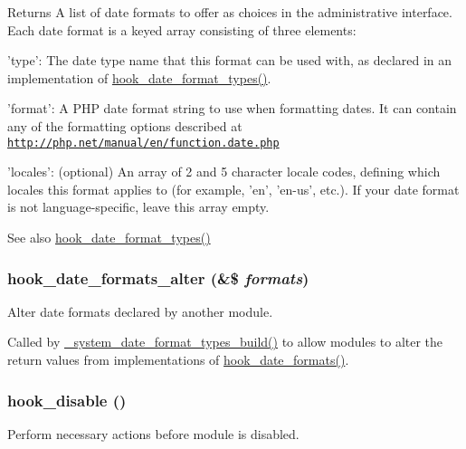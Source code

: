\begin{DoxyReturn}{Returns}
A list of date formats to offer as choices in the administrative interface. Each date format is a keyed array consisting of three elements:
\begin{DoxyItemize}
\item 'type': The date type name that this format can be used with, as declared in an implementation of \hyperlink{group__hooks_gaadde7af71d0b4f827cf7aac1c88c4d23}{hook\_\-date\_\-format\_\-types()}.
\item 'format': A PHP date format string to use when formatting dates. It can contain any of the formatting options described at \href{http://php.net/manual/en/function.date.php}{\tt http://php.net/manual/en/function.date.php}
\item 'locales': (optional) An array of 2 and 5 character locale codes, defining which locales this format applies to (for example, 'en', 'en-\/us', etc.). If your date format is not language-\/specific, leave this array empty.
\end{DoxyItemize}
\end{DoxyReturn}
\begin{DoxySeeAlso}{See also}
\hyperlink{group__hooks_gaadde7af71d0b4f827cf7aac1c88c4d23}{hook\_\-date\_\-format\_\-types()} 
\end{DoxySeeAlso}
\hypertarget{group__hooks_ga0adddc1a49ca34ded3f081894de9d4f7}{
\subsubsection[{hook\_\-date\_\-formats\_\-alter}]{\setlength{\rightskip}{0pt plus 5cm}hook\_\-date\_\-formats\_\-alter (\&\$ {\em formats})}}
\label{group__hooks_ga0adddc1a49ca34ded3f081894de9d4f7}
Alter date formats declared by another module.

Called by \hyperlink{system_8module_aed8872b51fe912cbf8d4e966af237b66}{\_\-system\_\-date\_\-format\_\-types\_\-build()} to allow modules to alter the return values from implementations of \hyperlink{group__hooks_ga2a190ba304193ab7752bfc489463a0d7}{hook\_\-date\_\-formats()}. \hypertarget{group__hooks_ga5872573d2180aa4b306e7d6c08a74c10}{
\subsubsection[{hook\_\-disable}]{\setlength{\rightskip}{0pt plus 5cm}hook\_\-disable ()}}
\label{group__hooks_ga5872573d2180aa4b306e7d6c08a74c10}
Perform necessary actions before module is disabled.

